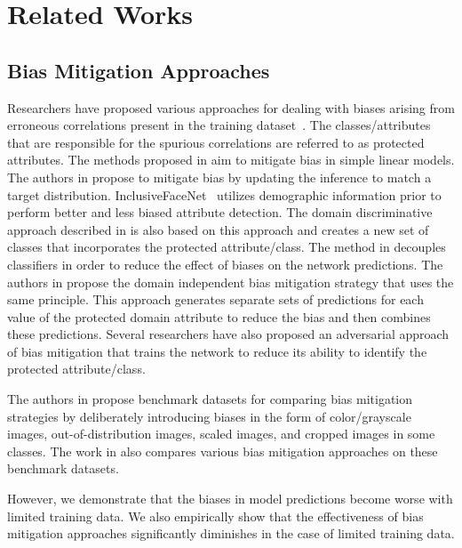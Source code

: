 \documentclass[10pt,twocolumn,letterpaper]{article}
\begin{document}
\section{Related Works}

\subsection{Bias Mitigation Approaches}
Researchers have proposed various approaches for dealing with biases arising from erroneous correlations present in the training dataset~\cite{anne2018women, grover2019bias, wang2019balanced, kim2019learning, li2019repair, quadrianto2019discovering, wang2019racial, grover2019fair}. The classes/attributes that are responsible for the spurious correlations are referred to as protected attributes. The methods proposed in \cite{khosla2012undoing, zemel2013learning} aim to mitigate bias in simple linear models. The authors in \cite{zhao_men_2017} propose to mitigate bias by updating the inference to match a target distribution. InclusiveFaceNet~\cite{ryu2018inclusivefacenet} utilizes demographic information prior to perform better and less biased attribute detection. The domain discriminative approach described in \cite{wang2020towards} is also based on this approach and creates a new set of classes that incorporates the protected attribute/class. The method in \cite{dwork2018decoupled} decouples classifiers in order to reduce the effect of biases on the network predictions. The authors in \cite{wang2020towards} propose the domain independent bias mitigation strategy that uses the same principle. This approach generates separate sets of predictions for each value of the protected domain attribute to reduce the bias and then combines these predictions. Several researchers have also proposed an adversarial approach of bias mitigation \cite{wang2020towards,alvi2018turning,zhang2018mitigating,edwards2016censoring,ganin2015unsupervised} that trains the network to reduce its ability to identify the protected attribute/class. 

The authors in \cite{wang2020towards} propose benchmark datasets for comparing bias mitigation strategies by deliberately introducing biases in the form of color/grayscale images, out-of-distribution images, scaled images, and cropped images in some classes. The work in \cite{wang2020towards} also compares various bias mitigation approaches on these benchmark datasets. 


However, we demonstrate that the biases in model predictions become worse with limited training data. We also empirically show that the effectiveness of bias mitigation approaches significantly diminishes in the case of limited training data. 
\end{document}
